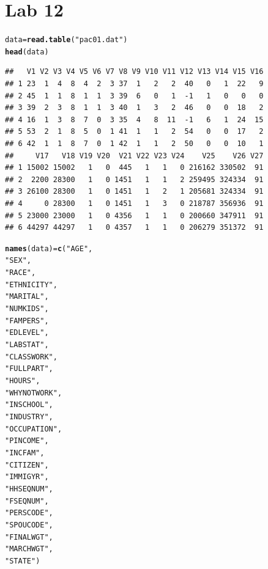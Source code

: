 \documentclass[11pt]{article}\usepackage[]{graphicx}\usepackage[]{color}
\makeatletter
\newcommand{\hlstr}[1]{\textcolor[rgb]{0.192,0.494,0.8}{#1}}%
\newcommand{\hlstd}[1]{\textcolor[rgb]{0.345,0.345,0.345}{#1}}%
\newcommand{\hlkwb}[1]{\textcolor[rgb]{0.69,0.353,0.396}{#1}}%
\newcommand{\hlkwd}[1]{\textcolor[rgb]{0.737,0.353,0.396}{\textbf{#1}}}%
\newenvironment{kframe}{%
 \def\at@end@of@kframe{}%
 \ifinner\ifhmode%
  \def\at@end@of@kframe{\end{minipage}}%
  \begin{minipage}{\columnwidth}%
 \fi\fi%
 \def\FrameCommand##1{\hskip\@totalleftmargin \hskip-\fboxsep
 \colorbox{shadecolor}{##1}\hskip-\fboxsep
     \hskip-\linewidth \hskip-\@totalleftmargin \hskip\columnwidth}%
 \MakeFramed {\advance\hsize-\width
   \@totalleftmargin\z@ \linewidth\hsize
   \@setminipage}}%
 {\par\unskip\endMakeFramed%
 \at@end@of@kframe}
\newenvironment{knitrout}{}{} %
\makeatother
\begin{document}
\section{Lab 12}

\begin{knitrout}
\color{fgcolor}\begin{kframe}
\begin{alltt}
\hlstd{data} \hlkwb{=} \hlkwd{read.table}\hlstd{(}\hlstr{"pac01.dat"}\hlstd{)}
\hlkwd{head}\hlstd{(data)}
\end{alltt}
\begin{lstlisting}[basicstyle=\ttfamily,breaklines=true]
##   V1 V2 V3 V4 V5 V6 V7 V8 V9 V10 V11 V12 V13 V14 V15 V16
## 1 23  1  4  8  4  2  3 37  1   2   2  40   0   1  22   9
## 2 45  1  1  8  1  1  3 39  6   0   1  -1   1   0   0   0
## 3 39  2  3  8  1  1  3 40  1   3   2  46   0   0  18   2
## 4 16  1  3  8  7  0  3 35  4   8  11  -1   6   1  24  15
## 5 53  2  1  8  5  0  1 41  1   1   2  54   0   0  17   2
## 6 42  1  1  8  7  0  1 42  1   1   2  50   0   0  10   1
##     V17   V18 V19 V20  V21 V22 V23 V24    V25    V26 V27
## 1 15002 15002   1   0  445   1   1   0 216162 330502  91
## 2  2200 28300   1   0 1451   1   1   2 259495 324334  91
## 3 26100 28300   1   0 1451   1   2   1 205681 324334  91
## 4     0 28300   1   0 1451   1   3   0 218787 356936  91
## 5 23000 23000   1   0 4356   1   1   0 200660 347911  91
## 6 44297 44297   1   0 4357   1   1   0 206279 351372  91
\end{lstlisting}
\begin{alltt}
\hlkwd{names}\hlstd{(data)}\hlkwb{=}\hlkwd{c}\hlstd{(}\hlstr{"AGE"}\hlstd{,}
              \hlstr{"SEX"}\hlstd{,}
              \hlstr{"RACE"}\hlstd{,}
              \hlstr{"ETHNICITY"}\hlstd{,}
              \hlstr{"MARITAL"}\hlstd{,}
              \hlstr{"NUMKIDS"}\hlstd{,}
              \hlstr{"FAMPERS"}\hlstd{,}
              \hlstr{"EDLEVEL"}\hlstd{,}
              \hlstr{"LABSTAT"}\hlstd{,}
              \hlstr{"CLASSWORK"}\hlstd{,}
              \hlstr{"FULLPART"}\hlstd{,}
              \hlstr{"HOURS"}\hlstd{,}
              \hlstr{"WHYNOTWORK"}\hlstd{,}
              \hlstr{"INSCHOOL"}\hlstd{,}
              \hlstr{"INDUSTRY"}\hlstd{,}
              \hlstr{"OCCUPATION"}\hlstd{,}
              \hlstr{"PINCOME"}\hlstd{,}
              \hlstr{"INCFAM"}\hlstd{,}
              \hlstr{"CITIZEN"}\hlstd{,}
              \hlstr{"IMMIGYR"}\hlstd{,}
              \hlstr{"HHSEQNUM"}\hlstd{,}
              \hlstr{"FSEQNUM"}\hlstd{,}
              \hlstr{"PERSCODE"}\hlstd{,}
              \hlstr{"SPOUCODE"}\hlstd{,}
              \hlstr{"FINALWGT"}\hlstd{,}
              \hlstr{"MARCHWGT"}\hlstd{,}
              \hlstr{"STATE"}\hlstd{)}


\end{alltt}
\end{kframe}
\end{knitrout}
\end{document}
